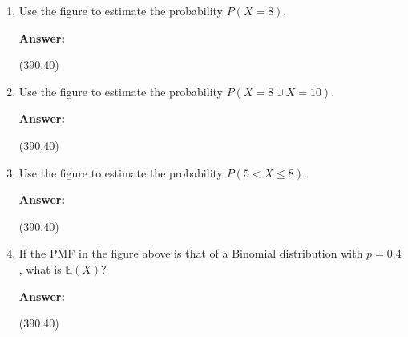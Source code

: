 \documentclass[11pt,twoside]{article}
\newcommand{\pts}[1]{\marginpar{ \small\hspace{0pt} \textit{[#1]} } }
\numberwithin{equation}{section}
\newcommand{\?}{\stackrel{?}{=}}
\begin{document}
  \begin{enumerate}[\bf (a)]

      \item   Use the figure to estimate the probability $P(X = 8)$. \pts{1}

      \vspace{2ex}
  \begin{minipage}[]{.1\linewidth}
    {\bf Answer:}
  \end{minipage}\qquad
  \begin{minipage}[]{.8\linewidth}
    \framebox(390,40){\phantom{\Huge t}  }     
  \end{minipage}

  \bigskip
  
  \item   Use the figure to estimate the probability $P(X = 8 \cup X = 10)$.\pts{2}  %

      \vspace{2ex}
  \begin{minipage}[]{.1\linewidth}
    {\bf Answer:}
  \end{minipage}\qquad
  \begin{minipage}[]{.8\linewidth}
    \framebox(390,40){\phantom{\Huge t}   }     
  \end{minipage}

  \bigskip

    \item   Use the figure to estimate the probability $P(5 < X \le 8)$.\pts{2} 

      \vspace{2ex}
  \begin{minipage}[]{.1\linewidth}
    {\bf Answer:}
  \end{minipage}\qquad
  \begin{minipage}[]{.8\linewidth}
    \framebox(390,40){\phantom{\Huge t} }     
  \end{minipage}

  \bigskip

\item If the PMF in the figure above is that of a Binomial distribution with $p=0.4$, what is $\mathbb{E}(X)$? \pts{1}

  \vspace{2ex}
  \begin{minipage}[]{.1\linewidth}
    {\bf Answer:}
  \end{minipage}\qquad
  \begin{minipage}[]{.8\linewidth}
    \framebox(390,40){\phantom{\Huge t}   }     
  \end{minipage}

  
  
  \end{enumerate}
\end{document}
